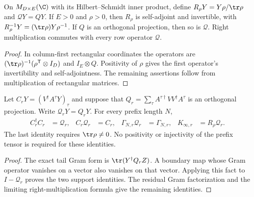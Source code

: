 \begin{definition}
    \label{def:residual_fixed_metric_row_projection}
    \leanok
    On $M_{D\times E}(\C)$ with its Hilbert--Schmidt inner product, define
    $R_\rho Y=Y\rho/\tr\rho$ and $\mathcal QY=QY$.
    If $E>0$ and $\rho>0$, then $R_\rho$ is self-adjoint and invertible,
    with $R_\rho^{-1}Y=(\tr\rho)Y\rho^{-1}$.
    If $Q$ is an orthogonal projection, then so is $\mathcal Q$.
    Right multiplication commutes with every row operator $\mathcal Q$.
\end{definition}
\begin{proof}\leanok
    In column-first rectangular coordinates the operators are
    $(\tr\rho)^{-1}(\rho^{\mathsf T}\otimes I_D)$ and $I_E\otimes Q$.
    Positivity of $\rho$ gives the first operator's invertibility and
    self-adjointness. The remaining assertions follow from multiplication
    of rectangular matrices.
\end{proof}

\begin{lemma}
    \label{thm:residual_exact_row_support}
    \leanok
    Let $C_rY=(V^\dagger A^\tau Y)_\tau$ and suppose that
    $Q_r=\sum_\tau A^{\tau\dagger}VV^\dagger A^\tau$ is an orthogonal
    projection. Write $\mathcal Q_rY=Q_rY$. For every prefix length $N$,
    \begin{align}
        C_r^\dagger C_r          & =\mathcal Q_r,       &
        C_r\mathcal Q_r          & =C_r,                &
        \Gamma_{N,r}\mathcal Q_r & =\Gamma_{N,r},       &
        K_{\infty,r}             & =R_\rho\mathcal Q_r.
    \end{align}
    The last identity requires $\tr\rho\ne0$. No positivity or
    injectivity of the prefix tensor is required for these identities.
\end{lemma}
\begin{proof}\leanok
    The exact tail Gram form is $\tr(Y^\dagger Q_rZ)$.
    A boundary map whose Gram operator vanishes on a vector also vanishes
    on that vector. Applying this fact to $I-\mathcal Q_r$ proves the two
    support identities. The residual Gram factorization and the limiting
    right-multiplication formula give the remaining identities.
\end{proof}

